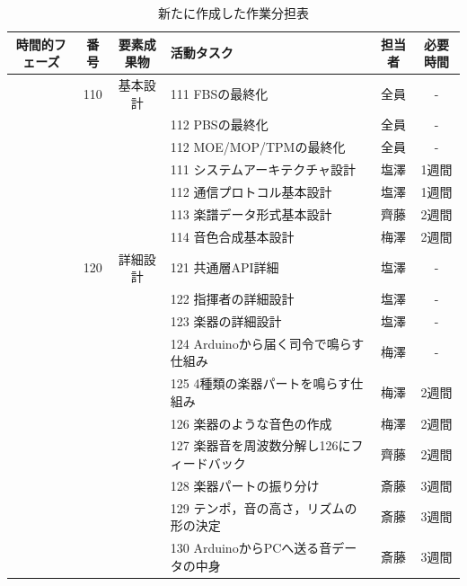 \documentclass[a4j,11pt,dvipdfmx]{jsarticle}
\begin{document}
\begin{table}[htbp]
\centering
\caption{新たに作成した作業分担表}
\renewcommand{\arraystretch}{0.9}
\label{yakuwari}
\begin{tabular}{|c|c|c|p{5cm}|c|c|}
\hline
時間的フェーズ & 番号 & 要素成果物 & 活動タスク & 担当者 & 必要時間 \\ \hline

& 110 & 基本設計 & 111 FBSの最終化 & 全員 & - \\ 
& & & 112 PBSの最終化 & 全員 & - \\ 
& & & 112 MOE/MOP/TPMの最終化 & 全員 & - \\ 
& & & 111 システムアーキテクチャ設計 & 塩澤 & 1週間 \\ 
& & & 112 通信プロトコル基本設計 & 塩澤 & 1週間 \\ 
& & & 113 楽譜データ形式基本設計 & 齊藤 & 2週間 \\ 
& & & 114 音色合成基本設計 & 梅澤 & 2週間 \\ 
& 120 & 詳細設計 & 121 共通層API詳細 & 塩澤 & - \\ 
& & & 122 指揮者の詳細設計 & 塩澤 & - \\ 
& & & 123 楽器の詳細設計 & 塩澤 & - \\ 
& & & 124 Arduinoから届く司令で鳴らす仕組み & 梅澤 & - \\ 
& & & 125 4種類の楽器パートを鳴らす仕組み & 梅澤 & 2週間 \\ 
& & & 126 楽器のような音色の作成 & 梅澤 & 2週間 \\ 
& & & 127 楽器音を周波数分解し126にフィードバック & 齊藤 & 2週間 \\ 
& & & 128 楽器パートの振り分け & 斎藤 & 3週間 \\ 
& & & 129 テンポ，音の高さ，リズムの形の決定 & 斎藤 & 3週間 \\ 
& & & 130 ArduinoからPCへ送る音データの中身 & 斎藤 & 3週間 \\ \hline


\end{tabular}
\end{table}
\end{document}

